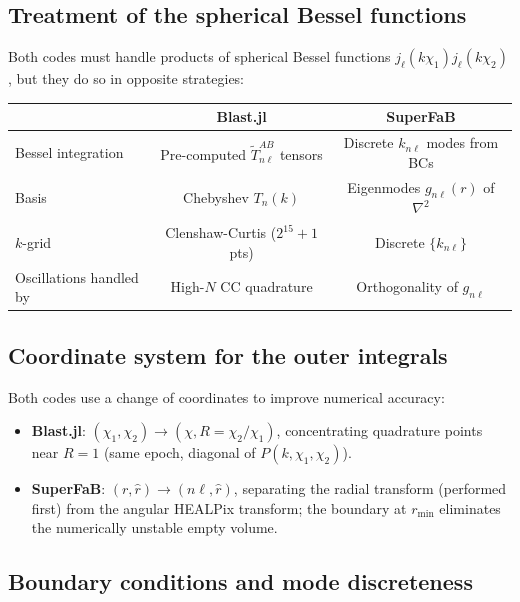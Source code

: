 \subsection{Treatment of the spherical Bessel functions}

Both codes must handle products of spherical Bessel functions
$j_\ell(k\chi_1)j_\ell(k\chi_2)$, but they do so in opposite
strategies:

\begin{center}
\renewcommand{\arraystretch}{1.5}
\begin{tabular}{lcc}
\toprule
& \textbf{Blast.jl} & \textbf{SuperFaB} \\
\midrule
Bessel integration & Pre-computed $\tilde{T}_{n\ell}^{AB}$ tensors &
    Discrete $k_{n\ell}$ modes from BCs \\
Basis & Chebyshev $T_n(k)$ & Eigenmodes $g_{n\ell}(r)$ of $\nabla^2$ \\
$k$-grid & Clenshaw-Curtis ($2^{15}+1$ pts) & Discrete $\{k_{n\ell}\}$ \\
Oscillations handled by & High-$N$ CC quadrature & Orthogonality of $g_{n\ell}$ \\
\bottomrule
\end{tabular}
\end{center}

\subsection{Coordinate system for the outer integrals}

Both codes use a change of coordinates to improve numerical accuracy:

\begin{itemize}
    \item \textbf{Blast.jl}: $(\chi_1,\chi_2)\to(\chi, R=\chi_2/\chi_1)$,
    concentrating quadrature points near $R=1$ (same epoch,
    diagonal of $P(k,\chi_1,\chi_2)$).
    \item \textbf{SuperFaB}: $(r,\hat{r})\to(n\ell, \hat{r})$,
    separating the radial transform (performed first) from the angular
    HEALPix transform; the boundary at $r_{\min}$ eliminates the
    numerically unstable empty volume.
\end{itemize}

\subsection{Boundary conditions and mode discreteness}

